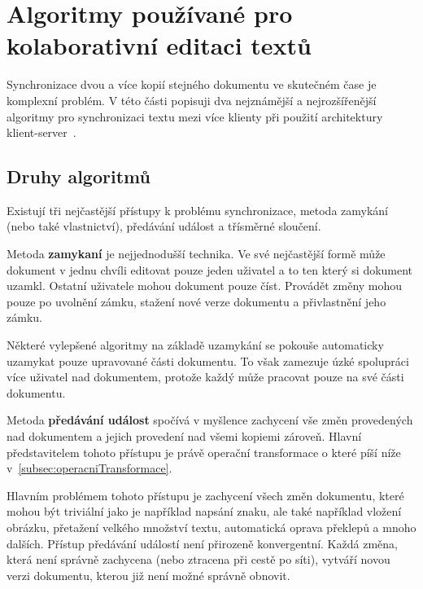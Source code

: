 
\section{Algoritmy používané pro kolaborativní editaci textů}\label{sec:algoritmyProKolaborativníEditaci}

Synchronizace dvou a více kopií stejného dokumentu ve skutečném čase je komplexní problém.
V této části popisuji dva nejznámější a nejrozšířenější algoritmy pro synchronizaci textu mezi více klienty při použití architektury klient-server~\cite{algoritmy:first}.

\subsection{Druhy algoritmů}\label{subsec:druhyAlgoritmů}

Existují tři nejčastější přístupy k problému synchronizace, metoda zamykání (nebo také vlastnictví), předávání událost a třísměrné sloučení.

Metoda \textbf{zamykaní} je nejjednodušší technika.
Ve své nejčastější formě může dokument v jednu chvíli editovat pouze jeden uživatel a to ten který si dokument uzamkl.
Ostatní uživatele mohou dokument pouze číst.
Provádět změny mohou pouze po uvolnění zámku, stažení nové verze dokumentu a přivlastnění jeho zámku.

Některé vylepšené algoritmy na základě uzamykání se pokouše automaticky uzamykat pouze upravované části dokumentu.
To však zamezuje úzké spolupráci více uživatel nad dokumentem, protože každý může pracovat pouze na své části dokumentu.

Metoda \textbf{předávání událost} spočívá v myšlence zachycení vše změn provedených nad dokumentem a jejich provedení nad všemi kopiemi zároveň.
Hlavní představitelem tohoto přístupu je právě operační transformace o které píší níže v~\ref{subsec:operacniTransformace}.

Hlavním problémem tohoto přístupu je zachycení všech změn dokumentu, které mohou být triviální jako je například napsání znaku, ale také například vložení obrázku, přetažení velkého množství textu, automatická oprava překlepů a mnoho dalších.
Přístup předávání událostí není přirozeně konvergentní.
Každá změna, která není správně zachycena (nebo ztracena při cestě po síti), vytváří novou verzi dokumentu, kterou již není možné správně obnovit.

